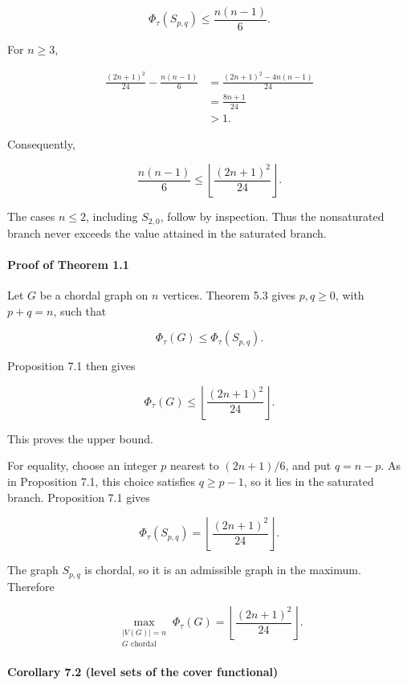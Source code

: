 \documentclass[english,11pt,a4paper]{article}
\begin{document}
\[
\Phi_\tau(S_{p,q})
\le
\frac{n(n-1)}6.
\]

For \(n\ge3\),

\[
\begin{aligned}
\frac{(2n+1)^2}{24}
-
\frac{n(n-1)}6
&=
\frac{(2n+1)^2-4n(n-1)}{24}\\
&=
\frac{8n+1}{24}\\
&>1.
\end{aligned}
\]

Consequently,

\[
\frac{n(n-1)}6
\le
\left\lfloor\frac{(2n+1)^2}{24}\right\rfloor.
\]

The cases \(n\le2\), including \(S_{2,0}\), follow by inspection. Thus
the nonsaturated branch never exceeds the value attained in the
saturated branch.

\paragraph{Proof of Theorem 1.1}\label{proof-of-theorem-1.1}

Let \(G\) be a chordal graph on \(n\) vertices. Theorem 5.3 gives
\(p,q\ge0\), with \(p+q=n\), such that

\[
\Phi_\tau(G)\le\Phi_\tau(S_{p,q}).
\]

Proposition 7.1 then gives

\[
\Phi_\tau(G)
\le
\left\lfloor\frac{(2n+1)^2}{24}\right\rfloor.
\]

This proves the upper bound.

For equality, choose an integer \(p\) nearest to \((2n+1)/6\), and put
\(q=n-p\). As in Proposition 7.1, this choice satisfies \(q\ge p-1\), so
it lies in the saturated branch. Proposition 7.1 gives

\[
\Phi_\tau(S_{p,q})
=
\left\lfloor\frac{(2n+1)^2}{24}\right\rfloor.
\]

The graph \(S_{p,q}\) is chordal, so it is an admissible graph in the
maximum. Therefore

\[
\max_{\substack{|V(G)|=n\\G\text{ chordal}}}
\Phi_\tau(G)
=
\left\lfloor\frac{(2n+1)^2}{24}\right\rfloor.
\]

\paragraph{Corollary 7.2 (level sets of the cover
functional)}\label{corollary-7.2-level-sets-of-the-cover-functional}
\end{document}
